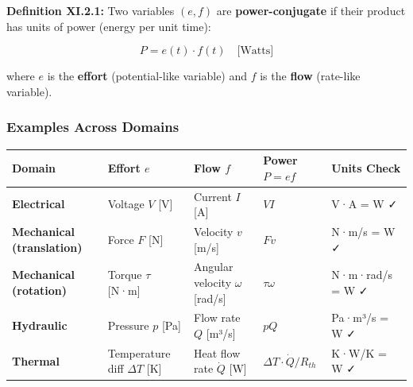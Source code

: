 \documentclass[
]{article}
\begin{document}
\textbf{Definition XI.2.1:} Two variables \((e, f)\) are
\textbf{power-conjugate} if their product has units of power (energy per
unit time):

\[P = e(t) \cdot f(t) \quad \text{[Watts]}\]

where \(e\) is the \textbf{effort} (potential-like variable) and \(f\)
is the \textbf{flow} (rate-like variable).

\subsubsection{Examples Across Domains}\label{examples-across-domains}

\begin{longtable}[]{@{}
  >{\raggedright\arraybackslash}p{}
  >{\raggedright\arraybackslash}p{}
  >{\raggedright\arraybackslash}p{}
  >{\raggedright\arraybackslash}p{}
  >{\raggedright\arraybackslash}p{}@{}}
\toprule\noalign{}
\begin{minipage}[b]{\linewidth}\raggedright
Domain
\end{minipage} & \begin{minipage}[b]{\linewidth}\raggedright
Effort \(e\)
\end{minipage} & \begin{minipage}[b]{\linewidth}\raggedright
Flow \(f\)
\end{minipage} & \begin{minipage}[b]{\linewidth}\raggedright
Power \(P = ef\)
\end{minipage} & \begin{minipage}[b]{\linewidth}\raggedright
Units Check
\end{minipage} \\
\midrule\noalign{}
\endhead
\bottomrule\noalign{}
\endlastfoot
\textbf{Electrical} & Voltage \(V\) {[}V{]} & Current \(I\) {[}A{]} &
\(VI\) & V·A = W ✓ \\
\textbf{Mechanical (translation)} & Force \(F\) {[}N{]} & Velocity \(v\)
{[}m/s{]} & \(Fv\) & N·m/s = W ✓ \\
\textbf{Mechanical (rotation)} & Torque \(\tau\) {[}N·m{]} & Angular
velocity \(\omega\) {[}rad/s{]} & \(\tau\omega\) & N·m·rad/s = W ✓ \\
\textbf{Hydraulic} & Pressure \(p\) {[}Pa{]} & Flow rate \(Q\)
{[}m³/s{]} & \(pQ\) & Pa·m³/s = W ✓ \\
\textbf{Thermal} & Temperature diff \(\Delta T\) {[}K{]} & Heat flow
rate \(\dot{Q}\) {[}W{]} & \(\Delta T \cdot \dot{Q}/R_{th}\) & K·W/K = W
✓ \\
\end{longtable}
\end{document}
